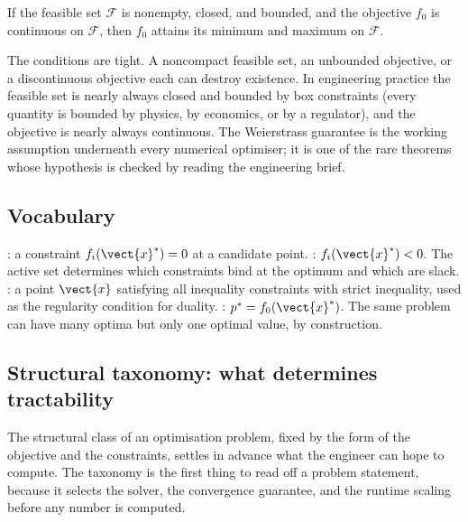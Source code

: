 \begin{theorem}[Weierstrass]
If the feasible set $\mathcal{F}$ is nonempty, closed, and
bounded, and the objective $f_{0}$ is continuous on $\mathcal{F}$,
then $f_{0}$ attains its minimum and maximum on $\mathcal{F}$.
\end{theorem}

The conditions are tight. A noncompact feasible set, an
unbounded objective, or a discontinuous objective each can
destroy existence. In engineering practice the feasible set is
nearly always closed and bounded by box constraints (every
quantity is bounded by physics, by economics, or by a regulator),
and the objective is nearly always continuous. The Weierstrass
guarantee is the working assumption underneath every numerical
optimiser; it is one of the rare theorems whose hypothesis is
checked by reading the engineering brief.

\subsection{Vocabulary}

: a constraint $f_{i}(\vect{x}^{*}) =
0$ at a candidate point. : $f_{i}(\vect{x}^{*})
< 0$. The active set determines which constraints bind at the
optimum and which are slack. : a
point $\vect{x}$ satisfying all inequality constraints with
strict inequality, used as the regularity condition for duality.
: $p^{*} = f_{0}(\vect{x}^{*})$. The same
problem can have many optima but only one optimal value, by
construction.

\subsection{Structural taxonomy: what determines tractability}

The structural class of an optimisation problem, fixed by the
form of the objective and the constraints, settles in advance
what the engineer can hope to compute. The taxonomy is the first
thing to read off a problem statement, because it selects the
solver, the convergence guarantee, and the runtime scaling
before any number is computed.

